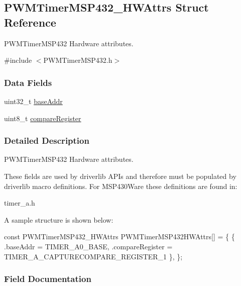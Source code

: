 \subsection{P\+W\+M\+Timer\+M\+S\+P432\+\_\+\+H\+W\+Attrs Struct Reference}
\label{struct_p_w_m_timer_m_s_p432___h_w_attrs}


P\+W\+M\+Timer\+M\+S\+P432 Hardware attributes.  




{\ttfamily \#include $<$P\+W\+M\+Timer\+M\+S\+P432.\+h$>$}

\subsubsection*{Data Fields}
\begin{DoxyCompactItemize}
\item 
uint32\+\_\+t \hyperlink{struct_p_w_m_timer_m_s_p432___h_w_attrs_a38a00f25e209ee1f208fcba5b1798260}{base\+Addr}
\item 
uint8\+\_\+t \hyperlink{struct_p_w_m_timer_m_s_p432___h_w_attrs_a2e726667a080f99fa9313402f949e3b8}{compare\+Register}
\end{DoxyCompactItemize}


\subsubsection{Detailed Description}
P\+W\+M\+Timer\+M\+S\+P432 Hardware attributes. 

These fields are used by driverlib A\+P\+Is and therefore must be populated by driverlib macro definitions. For M\+S\+P430\+Ware these definitions are found in\+:
\begin{DoxyItemize}
\item timer\+\_\+a.\+h
\end{DoxyItemize}

A sample structure is shown below\+: 
\begin{DoxyCode}
\textcolor{keyword}{const} PWMTimerMSP432_HWAttrs PWMTimerMSP432HWAttrs[] = \{
    \{
        .baseAddr = TIMER\_A0\_BASE,
        .compareRegister = TIMER\_A\_CAPTURECOMPARE\_REGISTER\_1
    \},
\};
\end{DoxyCode}
 

\subsubsection{Field Documentation}
